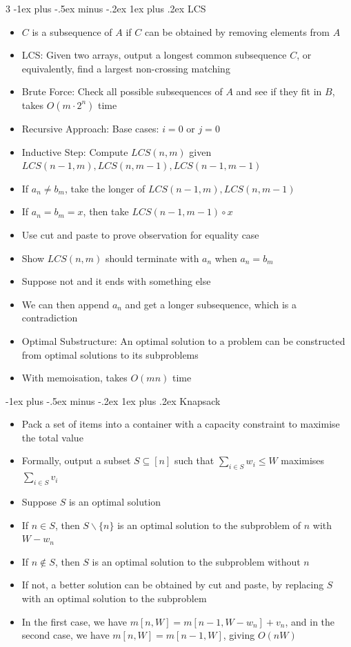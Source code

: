 \documentclass[10pt, landscape]{article}
\makeatletter
\renewcommand{\subsection}{\@startsection{subsection}{3}{0mm}%
                                {-1ex plus -.5ex minus -.2ex}%
                                {1ex plus .2ex}%
                                {\normalfont\small\bfseries}}%
\makeatother
\begin{document}
\begin{multicols*}{3}
\subsection{LCS}
\begin{itemize}
    \item $C$ is a subsequence of $A$ if $C$ can be obtained by removing elements from $A$
    \item LCS: Given two arrays, output a longest common subsequence $C$, or equivalently, find a largest non-crossing matching
    \item Brute Force: Check all possible subsequences of $A$ and see if they fit in $B$, takes $O(m\cdot 2^n)$ time
    \item Recursive Approach: Base cases: $i=0$ or $j=0$
    \item Inductive Step: Compute $LCS(n,m)$ given $LCS(n-1, m), LCS(n, m-1), LCS(n-1, m-1)$
    \item If $a_n \neq b_m$, take the longer of $LCS(n-1, m), LCS(n, m-1)$
    \item If $a_n = b_m =x$, then take $LCS(n-1, m-1) \circ x$
    \item Use cut and paste to prove observation for equality case
    \item Show $LCS(n,m)$ should terminate with $a_n$ when $a_n=b_m$
    \item Suppose not and it ends with something else
    \item We can then append $a_n$ and get a longer subsequence, which is a contradiction
    \item Optimal Substructure: An optimal solution to a problem can be constructed from optimal solutions to its subproblems
    \item With memoisation, takes $O(mn)$ time
\end{itemize}

\subsection{Knapsack}
\begin{itemize}
    \item Pack a set of items into a container with a capacity constraint to maximise the total value
    \item Formally, output a subset $S \subseteq [n]$ such that $\sum_{i \in S}w_i \leq W$ maximises $\sum_{i \in S} v_i$
    \item Suppose $S$ is an optimal solution
    \item If $n \in S$, then $S\backslash\{n\}$ is an optimal solution to the subproblem of $n$ with $W-w_n$
    \item If $n \notin S$, then $S$ is an optimal solution to the subproblem without $n$
    \item If not, a better solution can be obtained by cut and paste, by replacing $S$ with an optimal solution to the subproblem
    \item In the first case, we have $m[n, W]=m[n-1, W-w_n]+v_n$, and in the second case, we have $m[n, W]=m[n-1, W]$, giving $O(nW)$
\end{itemize}


\end{multicols*}
\end{document}
